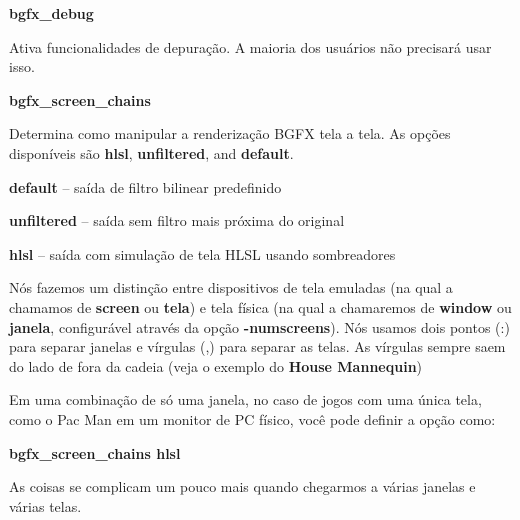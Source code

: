 \documentclass[letterpaper,10pt,brazil]{sphinxmanual}
\begin{document}
\begin{DUlineblock}{0em}
\item[] \textbf{bgfx\_debug}
\item[] 
\item[]
\begin{DUlineblock}{\DUlineblockindent}
\item[] Ativa funcionalidades de depuração. A maioria dos usuários não precisará usar isso.
\item[] 
\end{DUlineblock}
\item[] \textbf{bgfx\_screen\_chains}
\item[] 
\item[]
\begin{DUlineblock}{\DUlineblockindent}
\item[] Determina como manipular a renderização BGFX tela a tela. As opções disponíveis são \textbf{hlsl}, \textbf{unfiltered}, and \textbf{default}.
\item[] 
\item[] \textbf{default} -- saída de filtro bilinear predefinido
\item[] \textbf{unfiltered} -- saída sem filtro mais próxima do original
\item[] \textbf{hlsl} -- saída com simulação de tela HLSL usando sombreadores
\item[] 
\item[] Nós fazemos um distinção entre dispositivos de tela emuladas (na qual a chamamos de \textbf{screen} ou \textbf{tela}) e tela física (na qual a chamaremos de \textbf{window} ou \textbf{janela}, configurável através da opção \textbf{-numscreens}). Nós usamos dois pontos (:) para separar janelas e vírgulas (,) para separar as telas. As vírgulas sempre saem do lado de fora da cadeia (veja o exemplo do \textbf{House Mannequin})
\item[] 
\item[] Em uma combinação de só uma janela, no caso de jogos com uma única tela, como o Pac Man em um monitor de PC físico, você pode definir a opção como:
\item[] 
\item[]
\begin{DUlineblock}{\DUlineblockindent}
\item[] \textbf{bgfx\_screen\_chains hlsl}
\item[] 
\end{DUlineblock}
\item[] As coisas se complicam um pouco mais quando chegarmos a várias janelas e várias telas.
\item[] 

\end{DUlineblock}
\end{DUlineblock}
\end{document}
